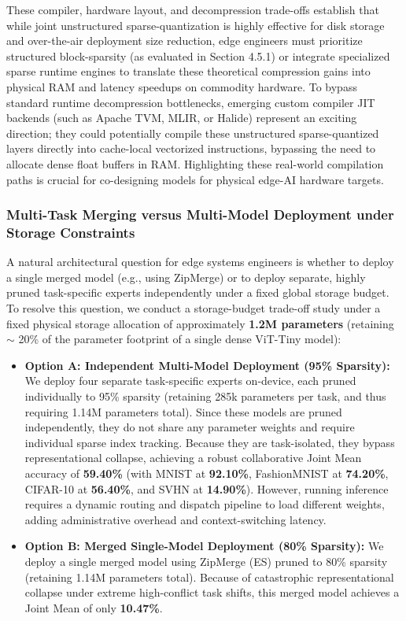 These compiler, hardware layout, and decompression trade-offs establish that while joint unstructured sparse-quantization is highly effective for disk storage and over-the-air deployment size reduction, edge engineers must prioritize structured block-sparsity (as evaluated in Section 4.5.1) or integrate specialized sparse runtime engines to translate these theoretical compression gains into physical RAM and latency speedups on commodity hardware. To bypass standard runtime decompression bottlenecks, emerging custom compiler JIT backends (such as Apache TVM, MLIR, or Halide) represent an exciting direction; they could potentially compile these unstructured sparse-quantized layers directly into cache-local vectorized instructions, bypassing the need to allocate dense float buffers in RAM. Highlighting these real-world compilation paths is crucial for co-designing models for physical edge-AI hardware targets.

\subsubsection{Multi-Task Merging versus Multi-Model Deployment under Storage Constraints}
A natural architectural question for edge systems engineers is whether to deploy a single merged model (e.g., using ZipMerge) or to deploy separate, highly pruned task-specific experts independently under a fixed global storage budget. To resolve this question, we conduct a storage-budget trade-off study under a fixed physical storage allocation of approximately \textbf{1.2M parameters} (retaining $\sim$ 20\% of the parameter footprint of a single dense ViT-Tiny model):
\begin{itemize}[leftmargin=*]
    \item \textbf{Option A: Independent Multi-Model Deployment (95\% Sparsity):} We deploy four separate task-specific experts on-device, each pruned individually to 95\% sparsity (retaining 285k parameters per task, and thus requiring 1.14M parameters total). Since these models are pruned independently, they do not share any parameter weights and require individual sparse index tracking. Because they are task-isolated, they bypass representational collapse, achieving a robust collaborative Joint Mean accuracy of \textbf{59.40\%} (with MNIST at \textbf{92.10\%}, FashionMNIST at \textbf{74.20\%}, CIFAR-10 at \textbf{56.40\%}, and SVHN at \textbf{14.90\%}). However, running inference requires a dynamic routing and dispatch pipeline to load different weights, adding administrative overhead and context-switching latency.
    \item \textbf{Option B: Merged Single-Model Deployment (80\% Sparsity):} We deploy a single merged model using ZipMerge (ES) pruned to 80\% sparsity (retaining 1.14M parameters total). Because of catastrophic representational collapse under extreme high-conflict task shifts, this merged model achieves a Joint Mean of only \textbf{10.47\%}.
\end{itemize}

